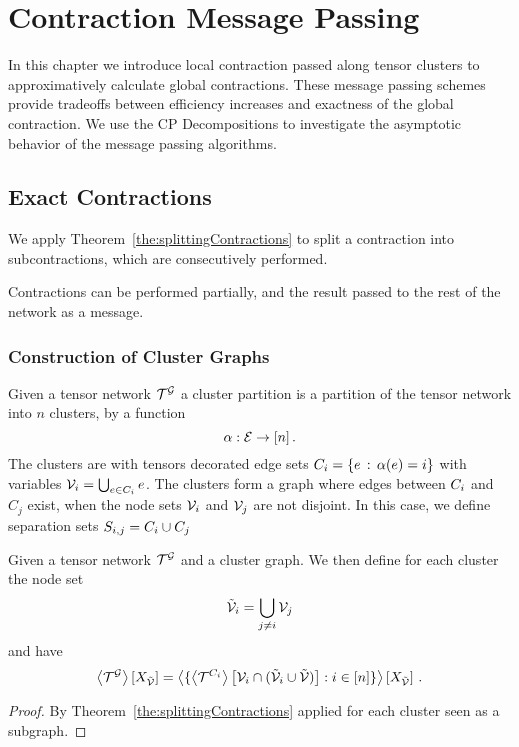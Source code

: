 \section{Contraction Message Passing}\label{cha:messagePassing}

In this chapter we introduce local contraction passed along tensor clusters to approximatively calculate global contractions.
These message passing schemes provide tradeoffs between efficiency increases and exactness of the global contraction.
We use the CP Decompositions to investigate the asymptotic behavior of the message passing algorithms.



\subsection{Exact Contractions}


We apply Theorem~\ref{the:splittingContractions} to split a contraction into subcontractions, which are consecutively performed.

Contractions can be performed partially, and the result passed to the rest of the network as a message.

\subsubsection{Construction of Cluster Graphs}

\begin{definition}
	Given a tensor network $\mathcal{T}^{\mathcal{G}}$ a cluster partition is a partition of the tensor network into $n$ clusters, by a function
		\[ \alpha : \mathcal{E} \rightarrow [n] \, . \]
	The clusters are with tensors decorated edge sets $C_{i} = \{e \, : \, \alpha(e) = i\}$ with variables $\mathcal{V}_i = \bigcup_{e \in C_{i}} e$.
	The clusters form a graph where edges between $C_{i}$ and $C_j$ exist, when the node sets $\mathcal{V}_i$ and $\mathcal{V}_j$ are not disjoint.
	In this case, we define separation sets $S_{i,j}=C_{i}\cup C_j$
\end{definition}

\begin{theorem}
	Given a tensor network $\mathcal{T}^{\mathcal{G}}$ and a cluster graph.
	We then define for each cluster the node set
		\[ \tilde{\mathcal{V}}_i = \bigcup_{j\neq i} \mathcal{V}_j \]
	and have
		\[ \left\langle \mathcal{T}^{\mathcal{G}}\right\rangle \left[ X_{\tilde{\mathcal{V}}} \right] = 
		\left\langle 
			\{ \left\langle  \mathcal{T}^{C_{i}} \right\rangle \left[ \mathcal{V}_i \cap (\tilde{\mathcal{V}}_i\cup\tilde{\mathcal{V}}) \right]  : i \in [n]\}
		\right\rangle \left[ X_{\tilde{\mathcal{V}}} \right]  \, . \]
\end{theorem}
\begin{proof}
	By Theorem~\ref{the:splittingContractions} applied for each cluster seen as a subgraph.
\end{proof}



